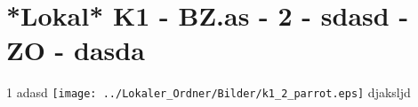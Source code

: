\section{*Lokal* K1 - BZ.as - 2 - sdasd - ZO - dasda}

\begin{langesbeispiel} \item[1] %
adasd \texttt{[image: ../Lokaler\_Ordner/Bilder/k1\_2\_parrot.eps]} djaksljd
\end{langesbeispiel}
